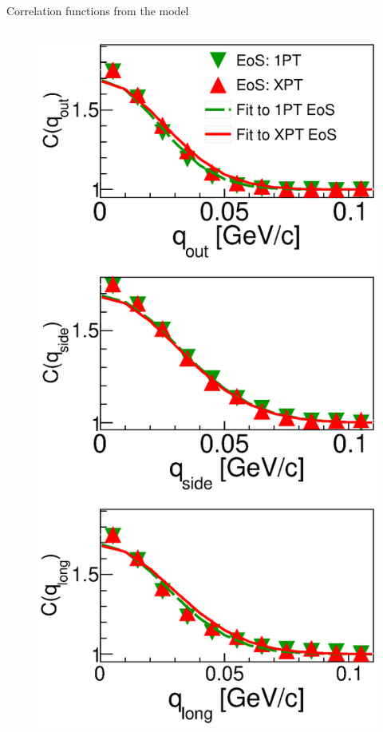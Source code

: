 \documentclass[final,hyperref={pdfpagelabels=false}, xcolor=dvipsnames]{beamer}
\begin{document}
\begin{frame}[shrink=30]
\begin{columns}[t]
   \begin{block}{Correlation functions from the model}
    \begin{columns}[t]
   \begin{figure}[H]
           \includegraphics[width=0.99\linewidth]{fig2_poster.eps}

\end{figure}
\end{columns}
\end{block}
\end{columns}
\end{frame}
\end{document}
